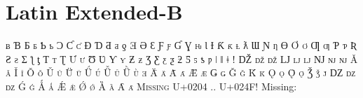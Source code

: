 

\presection\section*{\checkno Latin Extended-B}\postsection

\textsc{ƀ Ɓ Ƃ ƃ Ƅ ƅ Ɔ Ƈ ƈ Ɖ Ɗ Ƌ ƌ ƍ Ǝ Ə Ɛ Ƒ ƒ Ɠ Ɣ ƕ Ɩ Ɨ Ƙ ƙ ƚ 
ƛ Ɯ Ɲ ƞ Ɵ Ơ ơ Ƣ ƣ Ƥ ƥ Ʀ Ƨ ƨ Ʃ ƪ ƫ Ƭ ƭ Ʈ Ư ư Ʊ Ʋ Ƴ ƴ Ƶ ƶ Ʒ Ƹ ƹ 
ƺ ƻ Ƽ ƽ ƾ ƿ ǀ ǁ ǂ ǃ Ǆ ǅ ǆ Ǉ ǈ ǉ Ǌ ǋ ǌ Ǎ ǎ Ǐ ǐ Ǒ ǒ Ǔ ǔ Ǖ ǖ Ǘ ǘ
Ǚ ǚ Ǜ ǜ ǝ Ǟ ǟ Ǡ ǡ Ǣ ǣ Ǥ ǥ Ǧ ǧ Ǩ ǩ Ǫ ǫ Ǭ ǭ Ǯ ǯ ǰ Ǳ ǲ ǳ Ǵ ǵ Ǻ ǻ Ǽ ǽ Ǿ ǿ Ȁ ȁ Ȃ ȃ
Missing U+0204 .. U+024F!}
\hfill Missing: 